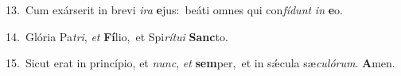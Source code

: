 {\numbfont\textcolor{\numbcolor}{13.}}~Cum exárserit in brevi \textit{i}\-\textit{ra} \textbf{e}\-jus:~\star beáti omnes qui con\-\textit{fí}\-\textit{dunt} \textit{in} \textbf{e}\-o.\par
{\numbfont\textcolor{\numbcolor}{14.}}~Glória Pa\-\textit{tri}\-, \textit{et} \textbf{Fí}\-lio,~\star et Spi\-\textit{rí}\-\textit{tu}\textit{i} \textbf{Sanc}\-to.\par
{\numbfont\textcolor{\numbcolor}{15.}}~Sicut erat in princípio, et \textit{nunc}\-, \textit{et} \textbf{sem}\-per,~\star et in sǽcula sæ\-\textit{cu}\-\textit{ló}\textit{rum}. \textbf{A}\-men.\par

